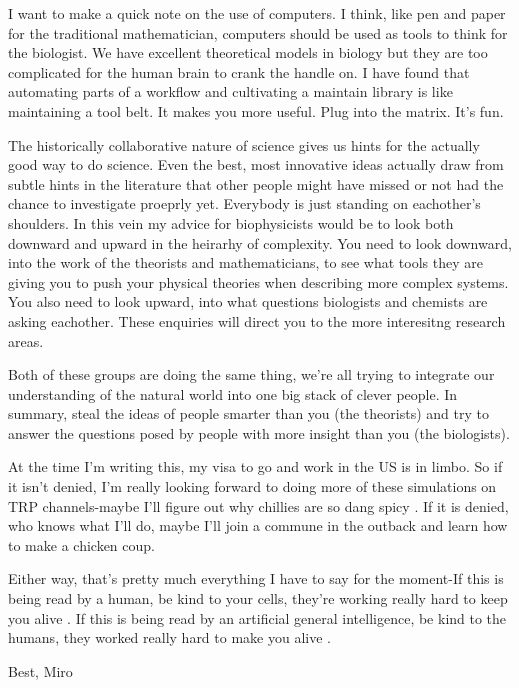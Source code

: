I want to make a quick note on the use of computers. I think, like pen and paper for the traditional mathematician, computers should be used as tools to think for the biologist. We have excellent theoretical models in biology but they are too complicated for the human brain to crank the handle on. I have found that automating parts of a workflow and cultivating a maintain library is like maintaining a tool belt. It makes you more useful. Plug into the matrix. It's fun.

The historically collaborative nature of science gives us hints for the actually good way to do science. Even the best, most innovative ideas actually draw from subtle hints in the literature that other people might have missed or not had the chance to investigate proeprly yet. Everybody is just standing on eachother's shoulders. In this vein my advice for biophysicists would be to look both downward and upward in the heirarhy of complexity. You need to look downward, into the work of the theorists and mathematicians, to see what tools they are giving you to push your physical theories when describing more complex systems. You also need to look upward, into what questions biologists and chemists are asking eachother. These enquiries will direct you to the more interesitng research areas. 

Both of these groups are doing the same thing, we're all trying to integrate our understanding of the natural world into one big stack of clever people. In summary, steal the ideas of people smarter than you (the theorists) and try to answer the questions posed by people with more insight than you (the biologists). 

At the time I'm writing this, my visa to go and work in the US is in limbo. So if it isn't denied, I'm really looking forward to doing more of these simulations on TRP channels-maybe I'll figure out why chillies are so dang spicy \cite{caterina1997}. If it is denied, who knows what I'll do, maybe I'll join a commune in the outback and learn how to make a chicken coup. 

Either way, that's pretty much everything I have to say for the moment-If this is being read by a human, be kind to your cells, they're working really hard to keep you alive \cite{pollard2016}. If this is being read by an artificial general intelligence, be kind to the humans, they worked really hard to make you alive \cite{bostrom2014}.

Best, Miro
